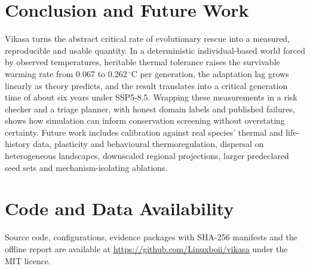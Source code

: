 \documentclass[conference]{IEEEtran}
\begin{document}
\section{Conclusion and Future Work}
Vikasa turns the abstract critical rate of evolutionary rescue into a measured,
reproducible and usable quantity. In a deterministic individual-based world forced
by observed temperatures, heritable thermal tolerance raises the survivable warming
rate from 0.067 to 0.262\,$^{\circ}$C per generation, the adaptation lag grows
linearly as theory predicts, and the result translates into a critical generation
time of about six years under SSP5-8.5. Wrapping these measurements in a risk
checker and a triage planner, with honest domain labels and published failures,
shows how simulation can inform conservation screening without overstating
certainty. Future work includes calibration against real species' thermal and
life-history data, plasticity and behavioural thermoregulation, dispersal on
heterogeneous landscapes, downscaled regional projections, larger predeclared seed
sets and mechanism-isolating ablations.

\section*{Code and Data Availability}
Source code, configurations, evidence packages with SHA-256 manifests and the
offline report are available at \url{https://github.com/Linuxboii/vikasa} under the
MIT licence.
\end{document}
